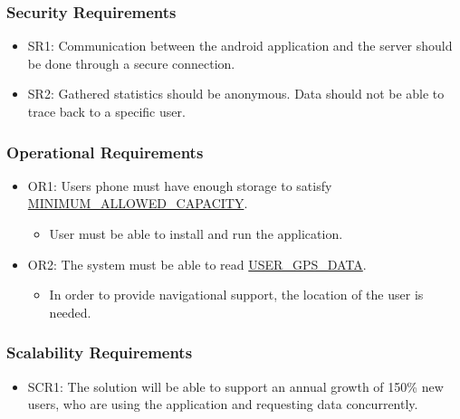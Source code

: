 \documentclass[]{article}
\begin{document}
\subsubsection{Security Requirements}
\begin{itemize}
	\item SR1: Communication between the android application and the server should be done through a secure connection.
	\item SR2: Gathered statistics should be anonymous. Data should not be able to trace back to a specific user.
\end{itemize}
\subsubsection{Operational Requirements}
\begin{itemize}
	\item OR1: Users phone must have enough storage to satisfy \hyperlink{MINCAP}{MINIMUM\_ALLOWED\_CAPACITY}.
	\begin{itemize}
		\item User must be able to install and run the application.
	\end{itemize}
	\item OR2: The system must be able to read \hyperlink{UGPSDT}{USER\_GPS\_DATA}.
	\begin{itemize}
		\item In order to provide navigational support, the location of the user is needed.
	\end{itemize}
\end{itemize}

\subsubsection{Scalability Requirements} %
\begin{itemize}
	\item SCR1: The solution will be able to support an annual growth of 150\% new users, who are using the application and requesting data concurrently.
\end{itemize}
\end{document}
